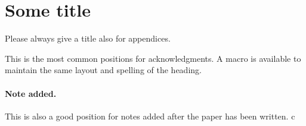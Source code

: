 \documentclass[a4paper,11pt]{article}
\begin{document}
\appendix
\section{Some title}
Please always give a title also for appendices.





\acknowledgments

This is the most common positions for acknowledgments. A macro is
available to maintain the same layout and spelling of the heading.

\paragraph{Note added.} This is also a good position for notes added
after the paper has been written. c












\end{document}
